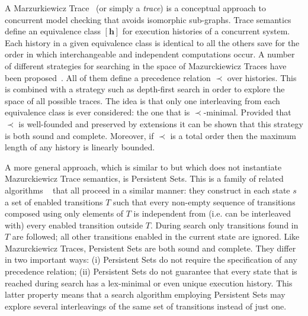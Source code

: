 A Marzurkiewicz Trace~\citep{mazurkiewicz86} (or simply a \emph{trace}) is a conceptual approach to
concurrent model checking that avoids isomorphic sub-graphs.  Trace semantics define an equivalence
class $[\mathbf h]$ for execution histories of a concurrent system. Each history in a given
equivalence class is identical to all the others save for the order in which interchangeable and
independent computations occur.  A number of different strategies for searching in the space of
Mazurckiewicz Traces have been proposed~\citep{esparza08}. All of them define a precedence relation
$\prec$ over histories. This is combined with a strategy such as depth-first search in order to
explore the space of all possible traces.  The idea is that only one interleaving from each
equivalence class is ever considered: the one that is $\prec$-minimal.  Provided that $\prec$ is
well-founded and preserved by extensions it can be shown that this strategy is both sound and
complete.  Moreover, if $\prec$ is a total order then the maximum length of any history is linearly
bounded.

A more general approach, which is similar to but which does not instantiate Mazurckiewicz Trace
semantics, is Persistent Sets. This is a family of related algorithms
~\citep{overman82,valmari89,godefroid91,godefroid96,wehrle12,alkhazraji12} that all
proceed in a similar manner: they construct in each state $s$ a set of enabled transitions $T$ such
that every non-empty sequence of transitions composed using only elements of $T$ is independent from
(i.e. can be interleaved with) every enabled transition outside $T$. During search only transitions
found in $T$ are followed; all other transitions enabled in the current state are ignored.  Like
Mazurckiewicz Traces, Persistent Sets are both sound and complete. They differ in two important
ways: (i) Persistent Sets do not require the specification of any precedence relation; (ii)
Persistent Sets do not guarantee that every state that is reached during search has a lex-minimal or
even unique execution history. This latter property means that a search algorithm employing
Persistent Sets may explore several interleavings of the same set of transitions instead of just
one.

